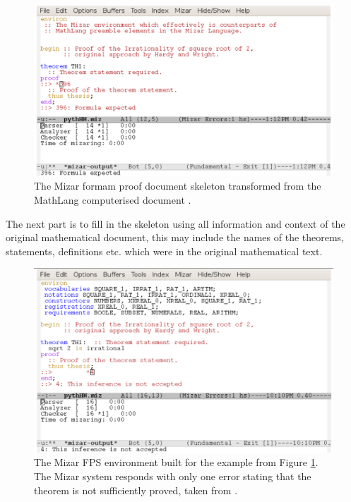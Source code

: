 \begin{figure}[H]
\begin{center}
\includegraphics[scale=0.35]{Figures/Background/mizarskel.png}
\end{center}
\caption{The Mizar formam proof document skeleton transformed from the MathLang computerised document
\cite{krzysztofphd}. \label{fig:mizarfps}}
\end{figure}

The next part is to fill in the skeleton using all information and context of the original mathematical document, this may include the names of the theorems, statements, definitions etc. which were in the original mathematical text.

\begin{figure}[H]
\begin{center}
\includegraphics[scale=0.4]{Figures/Background/mizarskelfill.png}
\end{center}
\caption{The Mizar FPS environment built for the example from Figure \ref{fig:mizarfps}. The Mizar system responds with only one error stating that the theorem is not sufficiently proved, taken from \cite{krzysztofphd}. \label{fig:mizarfpsfill}}
\end{figure}


